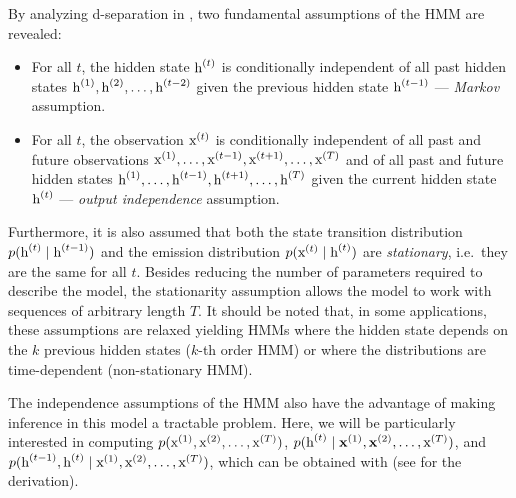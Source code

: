 By analyzing d-separation in , two fundamental assumptions of the HMM are revealed:
\begin{itemize}
    \item For all $t$, the hidden state ${\textnormal{h}}^{(t)}$ is conditionally independent of all past hidden states ${\textnormal{h}}^{(1)},{\textnormal{h}}^{(2)},\dots,{\textnormal{h}}^{(t-2)}$ given the previous hidden state ${\textnormal{h}}^{(t-1)}$ --- \emph{Markov} assumption.
    \item For all $t$, the observation ${\textnormal{x}}^{(t)}$ is conditionally independent of all past and future observations ${\textnormal{x}}^{(1)},\dots,{\textnormal{x}}^{(t-1)},{\textnormal{x}}^{(t+1)},\dots,{\textnormal{x}}^{(T)}$ and of all past and future hidden states ${\textnormal{h}}^{(1)},\dots,{\textnormal{h}}^{(t-1)},{\textnormal{h}}^{(t+1)},\dots,{\textnormal{h}}^{(T)}$ given the current hidden state ${\textnormal{h}}^{(t)}$ --- \emph{output independence} assumption.
\end{itemize}
Furthermore, it is also assumed that both the state transition distribution $p({\textnormal{h}}^{(t)} \mid {\textnormal{h}}^{(t-1)})$ and the emission distribution $p({\textnormal{x}}^{(t)} \mid {\textnormal{h}}^{(t)})$ are \emph{stationary}, i.e.\ they are the same for all $t$. Besides reducing the number of parameters required to describe the model, the stationarity assumption allows the model to work with sequences of arbitrary length $T$. It should be noted that, in some applications, these assumptions are relaxed yielding HMMs where the hidden state depends on the $k$ previous hidden states ($k$-th order HMM) or where the distributions are time-dependent (non-stationary HMM).

The independence assumptions of the HMM also have the advantage of making inference in this model a tractable problem. Here, we will be particularly interested in computing $p({\textnormal{x}}^{(1)}, {\textnormal{x}}^{(2)}, \dots, {\textnormal{x}}^{(T)})$, $p({\textnormal{h}}^{(t)} \mid {\mathbf{x}}^{(1)}, {\mathbf{x}}^{(2)}, \dots, {\textnormal{x}}^{(T)})$, and $p({\textnormal{h}}^{(t-1)}, {\textnormal{h}}^{(t)}  \mid {\textnormal{x}}^{(1)}, {\textnormal{x}}^{(2)}, \dots, {\textnormal{x}}^{(T)})$, which can be obtained with  (see \citet{Bishop2006} for the derivation).

